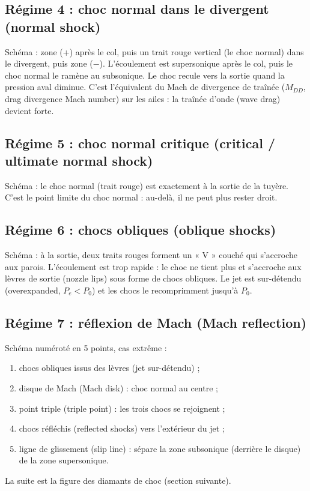 \documentclass{article}
\begin{document}
\subsection{Régime 4 : choc normal dans le divergent (normal shock)}
Schéma : zone (+) après le col, puis un trait rouge vertical (le choc normal) dans le divergent, puis zone (−). L'écoulement est supersonique après le col, puis le choc normal le ramène au subsonique. Le choc recule vers la sortie quand la pression aval diminue. C'est l'équivalent du Mach de divergence de traînée ($M_{DD}$, drag divergence Mach number) sur les ailes : la traînée d'onde (wave drag) devient forte.

\subsection{Régime 5 : choc normal critique (critical / ultimate normal shock)}
Schéma : le choc normal (trait rouge) est exactement à la sortie de la tuyère. C'est le point limite du choc normal : au-delà, il ne peut plus rester droit.

\subsection{Régime 6 : chocs obliques (oblique shocks)}
Schéma : à la sortie, deux traits rouges forment un « V » couché qui s'accroche aux parois. L'écoulement est trop rapide : le choc ne tient plus et s'accroche aux lèvres de sortie (nozzle lips) sous forme de chocs obliques. Le jet est sur-détendu (overexpanded, $P_e < P_0$) et les chocs le recomprimment jusqu'à $P_0$.

\subsection{Régime 7 : réflexion de Mach (Mach reflection)}
Schéma numéroté en 5 points, cas extrême :
\begin{enumerate}
\item chocs obliques issus des lèvres (jet sur-détendu) ;
\item disque de Mach (Mach disk) : choc normal au centre ;
\item point triple (triple point) : les trois chocs se rejoignent ;
\item chocs réfléchis (reflected shocks) vers l'extérieur du jet ;
\item ligne de glissement (slip line) : sépare la zone subsonique (derrière le disque) de la zone supersonique.
\end{enumerate}
La suite est la figure des diamants de choc (section suivante).
\end{document}
